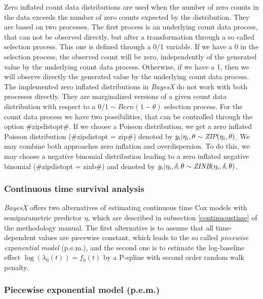 Zero inflated count data distributions are used when the number of
zero counts in the data exceeds the number of zero counts expected
by the distribution. They are based on two processes. The first
process is an underlying count data process, that can not be
observed directly, but after a transformation through a so called
selection process. This one is defined through a 0/1 variable. If we
have a 0 in the selection process, the observed count will be zero,
independently of the generated value by the underlying count data
process. Otherwise, if we have a 1, then we will observe directly
the generated value by the underlying count data process. The
implemented zero inflated distributions in {\em BayesX} do not work
with both processes directly. They are marginalized versions of a
given count data distribution with respect to a $0/1 \sim
Bern(1-\theta)$ selection process. For the count data process we
have two possibilities, that can be controlled through the option
#zipdistopt#. If we choose a Poisson distribution, we get a zero
inflated Poisson distribution (#zipdistopt = zip#) denoted by $y_i |
\eta_i,\theta \sim \mbox{\it ZIP}(\eta_i,\theta)$. We may combine both
approaches zero inflation and overdispersion. To do this, we may
choose a negative binomial distribution leading to a zero inflated
negative binomial (#zipdistopt = zinb#) and denoted by $y_i |
\eta_i,\delta, \theta \sim \mbox{\it ZINB}(\eta_i,\delta,\theta)$.


\subsubsection{Continuous time survival analysis}
\label{cont_survivalAnalysis}

\textit{BayesX} offers two alternatives of estimating continuous
time Cox models with semiparametric predictor $\eta$, which are
described in subsection \ref*{continuoustime} of the methodology
manual. The first alternative is to assume that all time-dependent
values are piecewise constant, which leads to the so called
\textit{piecewise exponential model} (p.e.m.), and the second one is
to estimate the log-baseline effect $\log(\lambda_0(t))=f_0(t)$ by a
P-spline with second order random walk penalty.

\subsubsection*{Piecewise exponential model (p.e.m.)}

